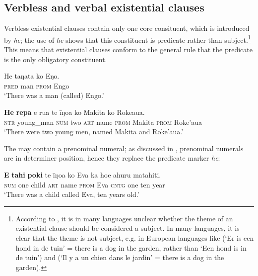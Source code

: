 \subsection{Verbless and verbal existential clauses}\label{sec:9.3.1}
Verbless existential clauses contain only one core consituent, which is introduced by \textit{he}; the use of \textit{he} shows that this constituent is predicate rather than subject.\footnote{\label{fn:473}According to \citet[241]{Dryer2007Clause}, it is in many languages unclear whether the theme of an existential clause should be considered a subject. In many languages, it is clear that the theme is not subject, e.g. in European languages like  (‘Er is een hond in de tuin’ = there is a dog in the garden, rather than ‘Een hond is in de tuin’) and  (‘Il y a un chien dans le jardin’ = there is a dog in the garden).} This means that existential clauses conform to the general rule that the predicate is the only obligatory constituent.

\ea\label{ex:9.59}
\gll He taŋata ko Eŋo. \\
\textsc{pred} man \textsc{prom} Engo \\

\glt 
‘There was a man (called) Engo.’ \textstyleExampleref{[Mtx-7-28.001]}
\z

\ea\label{ex:9.60}
\gll \textbf{He} \textbf{repa} e rua te {\ꞌ}īŋoa ko Makita ko Roke{\ꞌ}aua. \\
\textsc{ntr} young\_man \textsc{num} two \textsc{art} name \textsc{prom} Makita \textsc{prom} Roke’aua \\

\glt
‘There were two young men, named Makita and Roke’aua.’ \textstyleExampleref{[R243.001]} 
\z

The  may contain a prenominal numeral; as discussed in , prenominal numerals are in determiner position, hence they replace the predicate marker \textit{he}:

\ea\label{ex:9.61}
\gll \textbf{E} \textbf{tahi} \textbf{poki} te {\ꞌ}īŋoa ko Eva ka ho{\ꞌ}e {\ꞌ}ahuru matahiti. \\
\textsc{num} one child \textsc{art} name \textsc{prom} Eva \textsc{cntg} one ten year \\

\glt 
‘There was a child called Eva, ten years old.’ \textstyleExampleref{[R210.001]} 
\z

